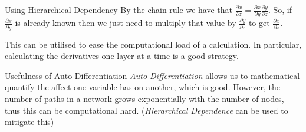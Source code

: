 \documentclass[11pt,a4paper]{article}
\begin{document}
  \begin{proposition}{Using Hierarchical Dependency}
    By the chain rule we have that $\frac{\partial x}{\partial z}=\frac{\partial x}{\partial y}\frac{\partial y}{\partial z}$. So, if $\frac{\partial x}{\partial y}$ is already known then we just need to multiply that value by $\frac{\partial y}{\partial z}$ to get $\frac{\partial x}{\partial z}$.
    \par This can be utilised to ease the computational load of a calculation. In particular, calculating the derivatives one layer at a time is a good strategy.
  \end{proposition}

  \begin{remark}{Usefulness of Auto-Differentiation}
    \textit{Auto-Differentiation} allows us to mathematical quantify the affect one variable has on another, which is good. However, the number of paths in a network grows exponentially with the number of nodes, thus this can be computational hard. (\textit{Hierarchical Dependence} can be used to mitigate this)
  \end{remark}
\end{document}
